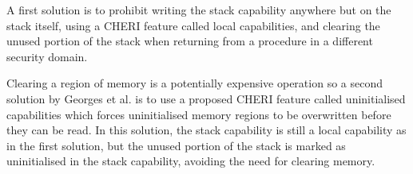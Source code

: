 \documentclass[main.tex]{subfiles}
\begin{document}
A first solution is to prohibit writing the stack capability anywhere but on the stack itself, using a CHERI feature called local capabilities, and clearing the unused portion of the stack when returning from a procedure in a different security domain.

Clearing a region of memory is a potentially expensive operation so a second solution by Georges et al.\cite{uninitcaps} is to use a proposed CHERI feature called uninitialised capabilities which forces uninitialised memory regions to be overwritten before they can be read. In this solution, the stack capability is still a local capability as in the first solution, but the unused portion of the stack is marked as uninitialised in the stack capability, avoiding the need for clearing memory.
\end{document}
